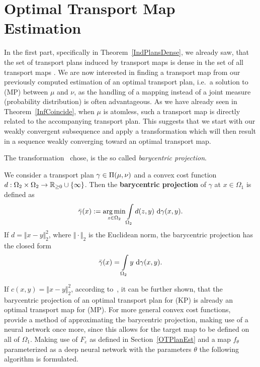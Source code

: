 \section{Optimal Transport Map Estimation}\label{OTMapEst}

In the first part, specifically in Theorem~\ref{IndPlansDense}, we already saw, that the set of transport plans induced by transport maps is dense in the set of all transport maps \TP{\mu}{\nu}. We are now interested in finding a transport map from our previously computed estimation of an optimal transport plan, i.e.~a solution to (MP) between $\mu$ and $\nu$, as the handling of a mapping instead of a joint measure (probability distribution) is often advantageous. As we have already seen in Theorem~\ref{InfCoincide}, when $\mu$ is atomless, such a transport map is directly related to the accompanying transport plan. This suggests that we start with our weakly convergent subsequence and apply a transformation which will then result in a sequence weakly converging toward an optimal transport map.

The transformation~\cite{Seg2018} chose, is the so called \textit{barycentric projection}.

\begin{definition}\label{BarCentrProj}
	We consider a transport plan $\gamma \in \TP{\mu}{\nu}$ and a convex cost function $\map[d]{\Omega_2 \times \Omega_2}{\RZero \cup \{ \infty \}}$. Then the \textbf{barycentric projection} of $\gamma$ at $x \in \Omega_1$ is defined as
	\[ \bar{\gamma}(x) := \argmin\limits_{z \in \Omega_2} \int\limits_{\Omega_2} d(z, y)~\Dx[x, y]{\gamma}. \]
	If $d = \Vert x - y \Vert_2^2$, where $\Vert \cdot \Vert_2$ is the Euclidean norm, the barycentric projection has the closed form
	\[ \bar{\gamma}(x) = \int\limits_{\Omega_2} y~\Dx[x, y]{\gamma}. \]
\end{definition}

If $c(x, y) = \Vert x - y \Vert_2^2$, according to~\cite{Seg2018}, it can be further shown, that the barycentric projection of an optimal transport plan for (KP) is already an optimal transport map for (MP). For more general convex cost functions,~\cite{Seg2018} provide a method of approximating the barycentric projection, making use of a neural network once more, since this allows for the target map to be defined on all of $\Omega_1$. Making use of $F_\varepsilon$ as defined in Section~\ref{OTPlanEst} and a map $f_\theta$ parameterized as a deep neural network with the parameters $\theta$ the following algorithm is formulated.

